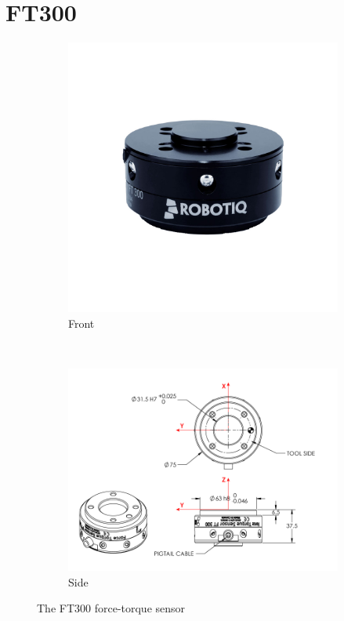 \documentclass[times, utf8, diplomski, english]{fer}
\begin{document}
\section{FT300}
\begin{figure}[h!]
    \centering
        \begin{subfigure}[h!,t]{0.34\textwidth}
        \includegraphics[clip, trim=0cm 5cm 0cm 5cm, width=\textwidth]{FT300_pic}
        \caption{Front}
    \end{subfigure}
    ~
    \begin{subfigure}[h!,t]{0.34\textwidth}
        \includegraphics[width=\textwidth]{FT300}
        \caption{Side}
    \end{subfigure}
    \caption{The FT300 force-torque sensor}\label{fig:FT300}
\end{figure}
\end{document}
